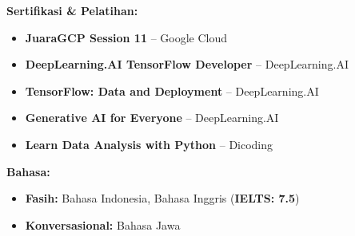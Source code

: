 \documentclass[10pt,a4paper]{article}
\begin{document}
\textbf{Sertifikasi \& Pelatihan:}
\begin{itemize}[leftmargin=0.2in, itemsep=-2pt, topsep=0pt]
    \small\item \textbf{JuaraGCP Session 11} -- Google Cloud
    \item \textbf{DeepLearning.AI TensorFlow Developer} -- DeepLearning.AI
    \item \textbf{TensorFlow: Data and Deployment} -- DeepLearning.AI
    \item \textbf{Generative AI for Everyone} -- DeepLearning.AI
    \item \textbf{Learn Data Analysis with Python} -- Dicoding
\end{itemize}
\vspace{2pt} %

\textbf{Bahasa:}
\begin{itemize}[leftmargin=0.2in, itemsep=-2pt, topsep=0pt]
    \small\item \textbf{Fasih:} Bahasa Indonesia, Bahasa Inggris (\textbf{IELTS: 7.5})
    \item \textbf{Konversasional:} Bahasa Jawa
\end{itemize}
\end{document}
